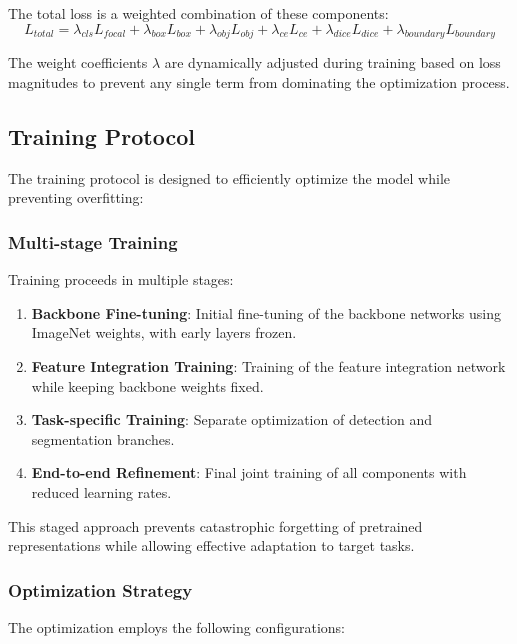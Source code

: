 The total loss is a weighted combination of these components:
\begin{equation}
    L_{total} = \lambda_{cls} L_{focal} + \lambda_{box} L_{box} + \lambda_{obj} L_{obj} + \lambda_{ce} L_{ce} + \lambda_{dice} L_{dice} + \lambda_{boundary} L_{boundary}
\end{equation}

The weight coefficients $\lambda$ are dynamically adjusted during training based on loss magnitudes to prevent any single term from dominating the optimization process.

\subsection{Training Protocol}
The training protocol is designed to efficiently optimize the model while preventing overfitting:

\subsubsection{Multi-stage Training}
Training proceeds in multiple stages:

\begin{enumerate}
    \item \textbf{Backbone Fine-tuning}: Initial fine-tuning of the backbone networks using ImageNet weights, with early layers frozen.
    
    \item \textbf{Feature Integration Training}: Training of the feature integration network while keeping backbone weights fixed.
    
    \item \textbf{Task-specific Training}: Separate optimization of detection and segmentation branches.
    
    \item \textbf{End-to-end Refinement}: Final joint training of all components with reduced learning rates.
\end{enumerate}

This staged approach prevents catastrophic forgetting of pretrained representations while allowing effective adaptation to target tasks.

\subsubsection{Optimization Strategy}
The optimization employs the following configurations:

